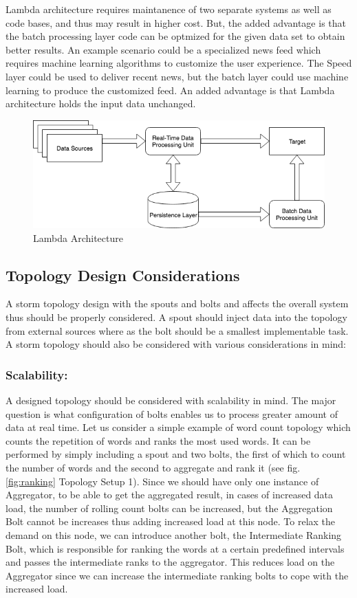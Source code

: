 \documentclass[runningheads,a4paper]{llncs}[2015/06/24]
\begin{document}
Lambda architecture requires maintanence of two separate systems as well as code bases, and thus may result in higher cost. But, the added advantage is that the batch processing layer code can be optmized for the given data set to obtain better results. An example scenario could be a specialized news feed which requires machine learning algorithms to customize the user experience. The Speed layer could be used to deliver recent news, but the batch layer could use machine learning to produce the customized feed. An added advantage is that Lambda architecture holds the input data unchanged.\cite{lambdastorm}

\begin{figure}
  \begin{center}
    \includegraphics[width=.7\textwidth]{lambda.png}
    \caption{Lambda Architecture}
    \label{fig:lambda}
   \end{center}
\end{figure}

\subsection{Topology Design Considerations}
A storm topology design with the spouts and bolts and affects the overall system thus should be properly considered. A spout should inject data into the topology from external sources where as the bolt should be a smallest implementable task. A storm topology should also be considered with various considerations in mind:

\subsubsection{Scalability:} A designed topology should be considered with scalability in mind. The major question is what configuration of bolts enables us to process greater amount of data at real time. Let us consider a simple example of word count topology which counts the repetition of words and ranks the most used words. It can be performed by simply including a spout and two bolts, the first of which to count the number of words and the second to aggregate and rank it (see fig. \ref{fig:ranking} Topology Setup 1).
Since we should have only one instance of Aggregator, to be able to get the aggregated result, in cases of increased data load, the number of rolling count bolts can be increased, but the Aggregation Bolt cannot be increases thus adding increased load at this node. To relax the demand on this node, we can introduce another bolt, the Intermediate Ranking Bolt, which is responsible for ranking the words at a certain predefined intervals and passes the intermediate ranks to the aggregator. This reduces load on the Aggregator since we can increase the intermediate ranking bolts to cope with the increased load.
\end{document}
